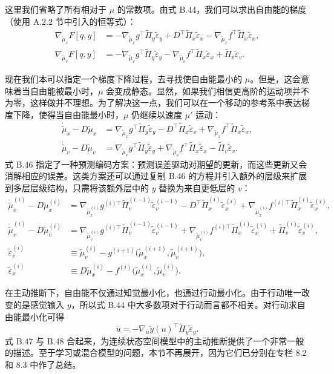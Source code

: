 这里我们省略了所有相对于 $\mu$ 的常数项。由式 B.44，我们可以求出自由能的梯度（使用 A.2.2 节中引入的恒等式）：
\begin{align}
\nabla_{\tilde\mu_x} F[q,y]
&=
- \nabla_{\tilde\mu_x} g^\top \tilde\Pi_y \tilde\varepsilon_y
+ D^\top \tilde\Pi_x \tilde\varepsilon_x
- \nabla_{\tilde\mu_x} f^\top \tilde\Pi_x \tilde\varepsilon_x,
\nonumber\\
\nabla_{\tilde\mu_v} F[q,y]
&=
- \nabla_{\tilde\mu_v} g^\top \tilde\Pi_y \tilde\varepsilon_y
- \nabla_{\tilde\mu_v} f^\top \tilde\Pi_x \tilde\varepsilon_x
+ \tilde\Pi_v \tilde\varepsilon_v.
\tag{B.45}
\end{align}

现在我们本可以指定一个梯度下降过程，去寻找使自由能最小的 $\mu$。但是，这会意味着当自由能被最小时，$\mu$ 会变成静态。显然，如果我们相信更高阶的运动项并不为零，这样做并不理想。为了解决这一点，我们可以在一个移动的参考系中表达梯度下降，使得当自由能最小时，$\mu$ 仍继续以速度 $\mu'$ 运动：
\begin{align}
\dot{\tilde\mu}_x - D\tilde\mu_x
&=
\nabla_{\tilde\mu_x} g^\top \tilde\Pi_y \tilde\varepsilon_y
- D^\top \tilde\Pi_x \tilde\varepsilon_x
+ \nabla_{\tilde\mu_x} f^\top \tilde\Pi_x \tilde\varepsilon_x,
\nonumber\\
\dot{\tilde\mu}_v - D\tilde\mu_v
&=
\nabla_{\tilde\mu_v} g^\top \tilde\Pi_y \tilde\varepsilon_y
+ \nabla_{\tilde\mu_v} f^\top \tilde\Pi_x \tilde\varepsilon_x
- \tilde\Pi_v \tilde\varepsilon_v.
\tag{B.46}
\end{align}
式 B.46 指定了一种预测编码方案：预测误差驱动对期望的更新，而这些更新又会消解相应的误差。这类方案还可以通过复制 B.46 的方程并引入额外的层级来扩展到多层层级结构，只需将该额外层中的 $y$ 替换为来自更低层的 $v$：
\begin{align}
\dot{\tilde\mu}_x^{(i)} - D\tilde\mu_x^{(i)}
&=
\nabla_{\tilde\mu_x^{(i)}} g^{(i)\top} \tilde\Pi_v^{(i-1)} \tilde\varepsilon_v^{(i-1)}
- D^\top \tilde\Pi_x^{(i)} \tilde\varepsilon_x^{(i)}
+ \nabla_{\tilde\mu_x^{(i)}} f^{(i)\top} \tilde\Pi_x^{(i)} \tilde\varepsilon_x^{(i)},
\nonumber\\
\dot{\tilde\mu}_v^{(i)} - D\tilde\mu_v^{(i)}
&=
\nabla_{\tilde\mu_v^{(i)}} g^{(i)\top} \tilde\Pi_v^{(i-1)} \tilde\varepsilon_v^{(i-1)}
+ \nabla_{\tilde\mu_v^{(i)}} f^{(i)\top} \tilde\Pi_x^{(i)} \tilde\varepsilon_x^{(i)}
+ \tilde\Pi_v^{(i)} \tilde\varepsilon_v^{(i)},
\nonumber\\
\tilde\varepsilon_v^{(i)}
&\equiv
\tilde\mu_v^{(i)} - g^{(i+1)}\!\bigl(\tilde\mu_x^{(i+1)}, \tilde\mu_v^{(i+1)}\bigr),
\nonumber\\
\tilde\varepsilon_x^{(i)}
&\equiv
D\tilde\mu_x^{(i)} - f^{(i)}\!\bigl(\tilde\mu_x^{(i)}, \tilde\mu_v^{(i)}\bigr).
\tag{B.47}
\end{align}

在主动推断下，自由能不仅通过知觉最小化，也通过行动最小化。由于行动唯一改变的是感觉输入 $y$，所以式 B.44 中大多数项对于行动而言都不相关。对行动求自由能最小化可得
\begin{equation}
\dot u
=
- \nabla_u \tilde y(u)^\top \tilde\Pi_y \tilde\varepsilon_y.
\tag{B.48}
\end{equation}
式 B.47 与 B.48 合起来，为连续状态空间模型中的主动推断提供了一个非常一般的描述。至于学习或混合模型的问题，本节不再展开，因为它们已分别在专栏 8.2 和 8.3 中作了总结。
